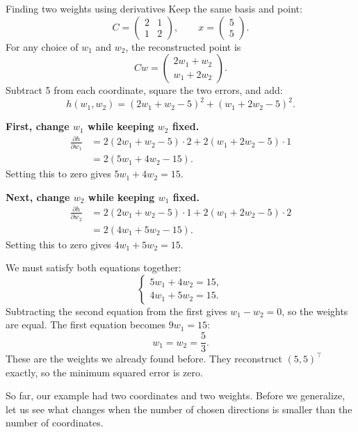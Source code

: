 \documentclass[a4paper,12pt,oneside]{report}
\begin{document}
\begin{framedexample}{Finding two weights using derivatives}
Keep the same basis and point:
\[
  C=\begin{pmatrix}2&1\\1&2\end{pmatrix},\qquad
  x=\begin{pmatrix}5\\5\end{pmatrix}.
\]
For any choice of $w_1$ and $w_2$, the reconstructed point is
\[
  Cw=\begin{pmatrix}2w_1+w_2\\w_1+2w_2\end{pmatrix}.
\]
Subtract 5 from each coordinate, square the two errors, and add:
\[
  h(w_1,w_2)=(2w_1+w_2-5)^2+(w_1+2w_2-5)^2.
\]

\textbf{First, change $w_1$ while keeping $w_2$ fixed.}
\[
\begin{aligned}
  \frac{\partial h}{\partial w_1}
    &=2(2w_1+w_2-5)\cdot2+2(w_1+2w_2-5)\cdot1\\
    &=2(5w_1+4w_2-15).
\end{aligned}
\]
Setting this to zero gives $5w_1+4w_2=15$.

\textbf{Next, change $w_2$ while keeping $w_1$ fixed.}
\[
\begin{aligned}
  \frac{\partial h}{\partial w_2}
    &=2(2w_1+w_2-5)\cdot1+2(w_1+2w_2-5)\cdot2\\
    &=2(4w_1+5w_2-15).
\end{aligned}
\]
Setting this to zero gives $4w_1+5w_2=15$.

We must satisfy both equations together:
\[
  \begin{cases}
    5w_1+4w_2=15,\\
    4w_1+5w_2=15.
  \end{cases}
\]
Subtracting the second equation from the first gives $w_1-w_2=0$,
so the weights are equal. The first equation becomes $9w_1=15$:
\[
  w_1=w_2=\frac53.
\]
These are the weights we already found before. They reconstruct
$(5,5)^\top$ exactly, so the minimum squared error is zero.
\end{framedexample}

So far, our example had two coordinates and two weights. Before
we generalize, let us see what changes when the number of chosen
directions is smaller than the number of coordinates.
\end{document}
